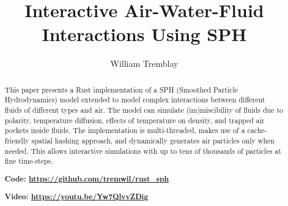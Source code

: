 \documentclass[acmtog,review]{acmart}
\begin{document}
\title{Interactive Air-Water-Fluid Interactions Using SPH}

\author{William Tremblay}

\renewcommand\shortauthors{Tremblay, W.}

\begin{abstract}
This paper presents a Rust implementation of a SPH (Smoothed Particle Hydrodynamics) model extended to model complex interactions between different fluids of different types and air. The model can simulate (im)miscibility of fluids due to polarity, temperature diffusion, effects of temperature on density, and trapped air pockets inside fluids. The implementation is multi-threaded, makes use of a cache-friendly spatial hashing approach, and dynamically generates air particles only when needed. This allows interactive simulations with up to tens of thousands of particles at fine time-steps.

\vspace{1em}
{\bf Code: \url{https://github.com/tremwil/rust_sph}}

{\bf Video: \url{https://youtu.be/Yw7QlvvZDig}}

\end{abstract}


%
%
\end{document}
